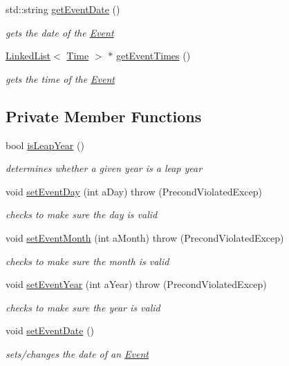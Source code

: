 \begin{DoxyCompactItemize}
std\+::string \hyperlink{classEvent_a5e30fe7bbcfef00ae42616555282f456}{get\+Event\+Date} ()
\begin{DoxyCompactList}\small\item\em gets the date of the \hyperlink{classEvent}{Event} \end{DoxyCompactList}\item 
\hyperlink{classLinkedList}{Linked\+List}$<$ \hyperlink{classTime}{Time} $>$ $\ast$ \hyperlink{classEvent_a9b57d73cbaa0944c63af5ebbc0a36ee5}{get\+Event\+Times} ()
\begin{DoxyCompactList}\small\item\em gets the time of the \hyperlink{classEvent}{Event} \end{DoxyCompactList}\end{DoxyCompactItemize}
\subsection*{Private Member Functions}
\begin{DoxyCompactItemize}
\item 
bool \hyperlink{classEvent_a3cdaa3ea67caaa086ba2efc3ab9e5ed8}{is\+Leap\+Year} ()
\begin{DoxyCompactList}\small\item\em determines whether a given year is a leap year \end{DoxyCompactList}\item 
void \hyperlink{classEvent_a1e9866232eb5f246aecbb47a1ab39c86}{set\+Event\+Day} (int a\+Day)  throw (\+Precond\+Violated\+Excep)
\begin{DoxyCompactList}\small\item\em checks to make sure the day is valid \end{DoxyCompactList}\item 
void \hyperlink{classEvent_ab1c2cc3102f3a9c0e68631ed43ddcfa7}{set\+Event\+Month} (int a\+Month)  throw (\+Precond\+Violated\+Excep)
\begin{DoxyCompactList}\small\item\em checks to make sure the month is valid \end{DoxyCompactList}\item 
void \hyperlink{classEvent_a7459c077b250731b7bf02ea382a9fc99}{set\+Event\+Year} (int a\+Year)  throw (\+Precond\+Violated\+Excep)
\begin{DoxyCompactList}\small\item\em checks to make sure the year is valid \end{DoxyCompactList}\item 
void \hyperlink{classEvent_acaab996ffd040f2bbfea8d9b96bfbe46}{set\+Event\+Date} ()
\begin{DoxyCompactList}\small\item\em sets/changes the date of an \hyperlink{classEvent}{Event} \end{DoxyCompactList}\end{DoxyCompactItemize}
